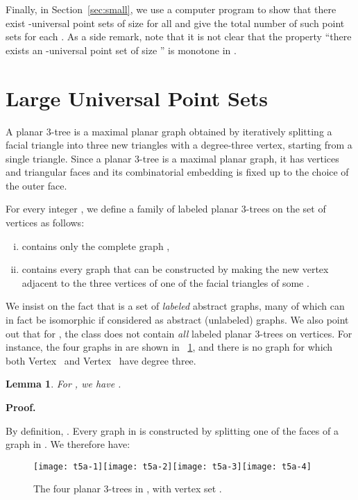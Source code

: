 \documentclass[11pt]{article}
\newtheorem{lemma}[equation]{Lemma}
\newenvironment{proof}{\noindent\textbf{Proof.}
}{\par\medskip}
\newcommand{\figscale}{1.1}
\begin{document}
Finally, in Section~\ref{sec:small}, we use a computer program to show that
there exist -universal point sets of size  for all  and give the
total number of such point sets for each . As a side remark, note that it is
not clear that the property ``there exists an -universal point set of size
'' is monotone in .

\section{Large Universal Point Sets}
\label{sec:uni}

A planar 3-tree is a maximal planar graph obtained by iteratively splitting a
facial triangle into three new triangles with a degree-three vertex, starting
from a single triangle. Since a planar 3-tree is a maximal planar graph, it has
 vertices and  triangular faces and its combinatorial embedding is
fixed up to the choice of the outer face. 

For every integer , we define a family  of labeled planar 3-trees
on the set of vertices  as follows:
\begin{enumerate}[(i)]
\item  contains only the complete graph ,
\item  contains every graph that can be constructed by making the new
vertex  adjacent to the three vertices of one of the  facial triangles
of some .
\end{enumerate}
We insist on the fact that  is a set of {\em labeled} abstract graphs,
many of which can in fact be isomorphic if considered as abstract (unlabeled)
graphs. We also point out that for , the class  does not contain
\emph{all} labeled planar 3-trees on  vertices. For instance, the four graphs
in  are shown in \figurename~\ref{fig:T5}, and there is no graph for which
both Vertex~ and Vertex~ have degree three.

\begin{lemma}\label{lem:tn_size_lower}
  For , we have .
\end{lemma}
\begin{proof}
  By definition, . Every graph in  is constructed by splitting
  one of the  faces of a graph in . We therefore have:
  
\end{proof}

\begin{figure}[htbp]
  \centering \texttt{[image: t5a-1]}\hfill \texttt{[image: t5a-2]}\hfill \texttt{[image: t5a-3]}\hfill \texttt{[image: t5a-4]}
  \caption{\label{fig:T5}The four planar 3-trees in , with vertex set .}
\end{figure}
\end{document}
